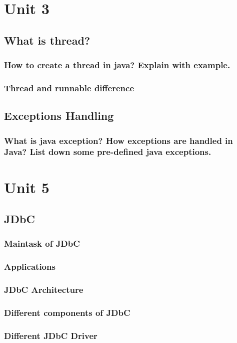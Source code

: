 \documentclass[11pt, a4paper]{book}
\begin{document}
\chapter{Unit 3}
\section{What is thread?}
\subsection{How to create a thread in java? Explain with example.}
\subsection{Thread and runnable difference}
\section{Exceptions Handling}
\subsection{What is java exception? How exceptions are handled in Java? List down some pre-defined java exceptions.}

\chapter{Unit 5}
\section{JDbC}
\subsection{Maintask of JDbC}
\subsection{Applications}
\subsection{JDbC Architecture}
\subsection{Different components of JDbC}
\subsection{Different JDbC Driver}
\end{document}
